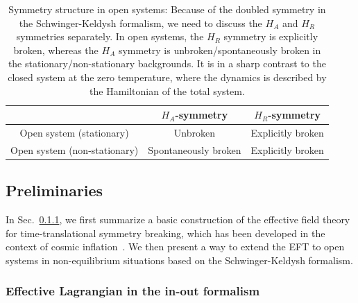 \documentclass[a4paper,11pt]{article}
\begin{document}
\begin{table}[t]
  \centering
  \begin{tabular}{c|cc}
    \hline
    &$H_{A}$-symmetry&$H_{R}$-symmetry\\
    \hline \hline
   Open system (stationary) & Unbroken & Explicitly broken \\
 Open system (non-stationary) & Spontaneously broken & Explicitly broken  \\
    \hline
  \end{tabular}
 \caption{Symmetry structure in open systems: Because of the doubled symmetry in the Schwinger-Keldysh formalism, we need to discuss the $H_A$ and $H_R$ symmetries separately. In open systems, the $H_R$ symmetry is explicitly broken, whereas the $H_A$ symmetry is unbroken/spontaneously broken in the stationary/non-stationary backgrounds.
 It is in a sharp contrast to the closed system at the zero temperature, where the dynamics is described by the Hamiltonian of the total system.
 }
 \label{table:ss}
\end{table}





\subsection{Preliminaries}
\label{sec:Prelim}
In Sec.~\ref{subsec:EFT_in-out}, 
we first summarize a basic construction of the effective field theory 
for time-translational symmetry breaking, which has been developed 
in the context of cosmic inflation~\cite{Cheung:2007st}.
We then present a way to extend the EFT to open systems 
in non-equilibrium situations based on the Schwinger-Keldysh formalism.





\subsubsection{Effective Lagrangian in the in-out formalism}
\label{subsec:EFT_in-out}
\end{document}
